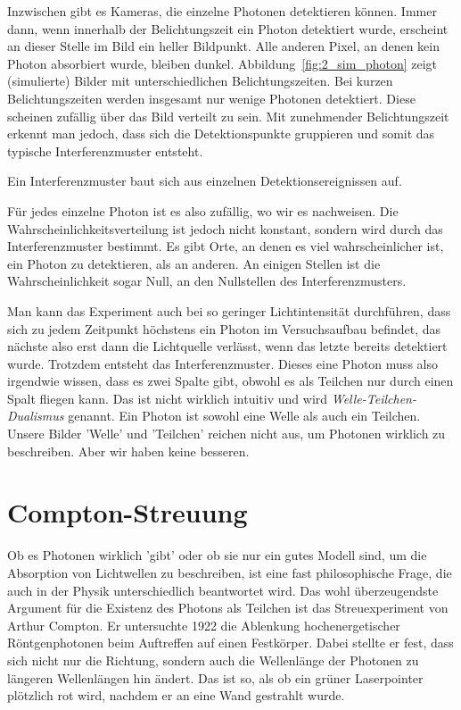  Inzwischen gibt es Kameras, die einzelne Photonen detektieren können. Immer dann, wenn innerhalb der Belichtungszeit ein Photon detektiert wurde, erscheint an dieser Stelle im Bild ein heller Bildpunkt. Alle anderen Pixel, an denen kein Photon absorbiert wurde, bleiben dunkel. Abbildung~\ref{fig:2_sim_photon} zeigt (simulierte) Bilder mit unterschiedlichen Belichtungszeiten. Bei kurzen Belichtungszeiten werden insgesamt nur wenige Photonen detektiert. Diese scheinen zufällig über das Bild verteilt zu sein. Mit zunehmender Belichtungszeit erkennt man jedoch, dass sich die Detektionspunkte gruppieren und somit das typische Interferenzmuster entsteht.

\begin{marginfigure}
    \caption{Ein Interferenzmuster baut sich aus einzelnen Detektionsereignissen auf.}
    \label{fig:2_sim_photon}
\end{marginfigure}

 Für jedes einzelne Photon ist es also zufällig, wo wir es nachweisen. Die Wahrscheinlichkeitsverteilung ist jedoch nicht konstant, sondern wird durch das Interferenzmuster bestimmt. Es gibt Orte, an denen es viel wahrscheinlicher ist, ein Photon zu detektieren, als an anderen. An einigen Stellen ist die Wahrscheinlichkeit sogar Null, an den Nullstellen des Interferenzmusters.

 Man kann das Experiment auch bei so geringer Lichtintensität durchführen, dass sich zu jedem Zeitpunkt höchstens ein Photon im Versuchsaufbau befindet, das nächste also erst dann die Lichtquelle verlässt, wenn das letzte bereits detektiert wurde. Trotzdem entsteht das Interferenzmuster. Dieses eine Photon muss also irgendwie wissen, dass es zwei Spalte gibt, obwohl es als Teilchen nur durch einen Spalt fliegen kann. Das ist nicht wirklich intuitiv und wird \emph{Welle-Teilchen-Dualismus} genannt. Ein Photon ist sowohl eine Welle als auch ein Teilchen. Unsere Bilder 'Welle' und 'Teilchen' reichen nicht aus, um Photonen wirklich zu beschreiben. Aber wir haben keine besseren.



 \section{Compton-Streuung}

 Ob es Photonen wirklich 'gibt' oder ob sie nur ein gutes Modell sind, um die Absorption von Lichtwellen zu beschreiben, ist eine fast philosophische Frage, die auch in der Physik unterschiedlich beantwortet wird. Das wohl überzeugendste Argument für die Existenz des Photons als Teilchen ist das Streuexperiment von Arthur Compton. Er untersuchte 1922 die Ablenkung hochenergetischer Röntgenphotonen beim Auftreffen auf einen Festkörper. Dabei stellte er fest, dass sich nicht nur die Richtung, sondern auch die Wellenlänge der Photonen zu längeren Wellenlängen hin ändert. Das ist so, als ob ein grüner Laserpointer plötzlich rot wird, nachdem er an eine Wand gestrahlt wurde.

